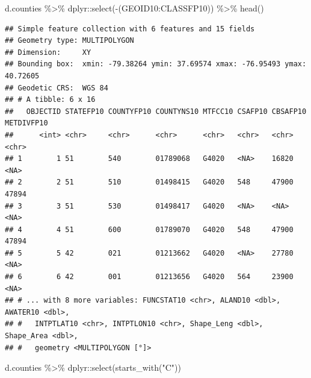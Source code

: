 \documentclass[]{article}
\newenvironment{Shaded}{\begin{snugshade}}{\end{snugshade}}
\newcommand{\FunctionTok}[1]{\textcolor[rgb]{0.00,0.00,0.00}{#1}}
\newcommand{\NormalTok}[1]{#1}
\newcommand{\SpecialCharTok}[1]{\textcolor[rgb]{0.00,0.00,0.00}{#1}}
\newcommand{\StringTok}[1]{\textcolor[rgb]{0.31,0.60,0.02}{#1}}
\begin{document}
\begin{Shaded}
\begin{Highlighting}[]
\NormalTok{d.counties }\SpecialCharTok{\%\textgreater{}\%}\NormalTok{ dplyr}\SpecialCharTok{::}\FunctionTok{select}\NormalTok{(}\SpecialCharTok{{-}}\NormalTok{(GEOID10}\SpecialCharTok{:}\NormalTok{CLASSFP10)) }\SpecialCharTok{\%\textgreater{}\%} \FunctionTok{head}\NormalTok{() }
\end{Highlighting}
\end{Shaded}

\begin{verbatim}
## Simple feature collection with 6 features and 15 fields
## Geometry type: MULTIPOLYGON
## Dimension:     XY
## Bounding box:  xmin: -79.38264 ymin: 37.69574 xmax: -76.95493 ymax: 40.72605
## Geodetic CRS:  WGS 84
## # A tibble: 6 x 16
##   OBJECTID STATEFP10 COUNTYFP10 COUNTYNS10 MTFCC10 CSAFP10 CBSAFP10 METDIVFP10
##      <int> <chr>     <chr>      <chr>      <chr>   <chr>   <chr>    <chr>     
## 1        1 51        540        01789068   G4020   <NA>    16820    <NA>      
## 2        2 51        510        01498415   G4020   548     47900    47894     
## 3        3 51        530        01498417   G4020   <NA>    <NA>     <NA>      
## 4        4 51        600        01789070   G4020   548     47900    47894     
## 5        5 42        021        01213662   G4020   <NA>    27780    <NA>      
## 6        6 42        001        01213656   G4020   564     23900    <NA>      
## # ... with 8 more variables: FUNCSTAT10 <chr>, ALAND10 <dbl>, AWATER10 <dbl>,
## #   INTPTLAT10 <chr>, INTPTLON10 <chr>, Shape_Leng <dbl>, Shape_Area <dbl>,
## #   geometry <MULTIPOLYGON [°]>
\end{verbatim}

\begin{Shaded}
\begin{Highlighting}[]
\NormalTok{d.counties }\SpecialCharTok{\%\textgreater{}\%}\NormalTok{ dplyr}\SpecialCharTok{::}\FunctionTok{select}\NormalTok{(}\FunctionTok{starts\_with}\NormalTok{(}\StringTok{"C"}\NormalTok{))}
\end{Highlighting}
\end{Shaded}
\end{document}
